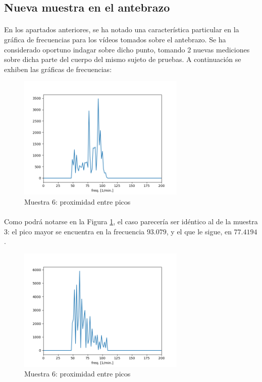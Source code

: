 \documentclass[12pt, twocolumn]{article}
\begin{document}
	\subsection{Nueva muestra en el antebrazo}
	
	\paragraph{} En los apartados anteriores, se ha notado una característica particular en la gráfica de frecuencias para los vídeos tomados sobre el antebrazo. Se ha considerado oportuno indagar sobre dicho punto, tomando 2 nuevas mediciones sobre dicha parte del cuerpo del mismo sujeto de pruebas. A continuación se exhiben las gráficas de frecuencias:
	
	\begin{figure}[H]
		\centering
		\includegraphics[width=8cm]{sample6-c200_200_5.png}
		\caption{Muestra 6: proximidad entre picos}
		\label{6prox}
	\end{figure}
	
	\paragraph{} Como podrá notarse en la Figura \ref{6prox}, el caso parecería ser idéntico al de la muestra 3: el pico mayor se encuentra en la frecuencia $93.079$, y el que le sigue, en $77.4194$.
	
	\begin{figure}[H]
		\centering
		\includegraphics[width=8cm]{sample7-c200_200_5.png}
		\caption{Muestra 6: proximidad entre picos}
		\label{7nprox}
	\end{figure}
	
\end{document}
